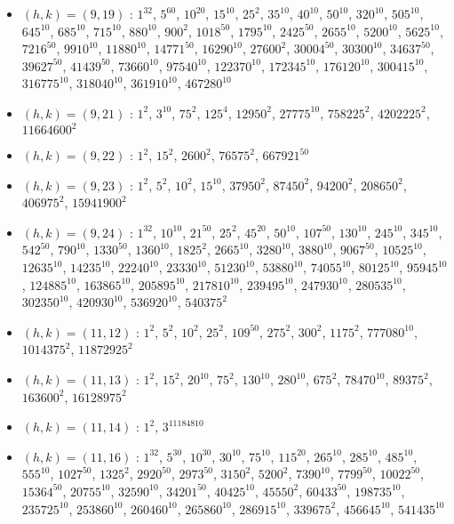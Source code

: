 \begin{itemize}
\item $(h,k)=(9,19)$ : $1^{32}$, $5^{60}$, $10^{20}$, $15^{10}$, $25^{2}$, $35^{10}$, $40^{10}$, $50^{10}$, $320^{10}$, $505^{10}$, $645^{10}$, $685^{10}$, $715^{10}$, $880^{10}$, $900^{2}$, $1018^{50}$, $1795^{10}$, $2425^{50}$, $2655^{10}$, $5200^{10}$, $5625^{10}$, $7216^{50}$, $9910^{10}$, $11880^{10}$, $14771^{50}$, $16290^{10}$, $27600^{2}$, $30004^{50}$, $30300^{10}$, $34637^{50}$, $39627^{50}$, $41439^{50}$, $73660^{10}$, $97540^{10}$, $122370^{10}$, $172345^{10}$, $176120^{10}$, $300415^{10}$, $316775^{10}$, $318040^{10}$, $361910^{10}$, $467280^{10}$
\item $(h,k)=(9,21)$ : $1^{2}$, $3^{10}$, $75^{2}$, $125^{4}$, $12950^{2}$, $27775^{10}$, $758225^{2}$, $4202225^{2}$, $11664600^{2}$
\item $(h,k)=(9,22)$ : $1^{2}$, $15^{2}$, $2600^{2}$, $76575^{2}$, $667921^{50}$
\item $(h,k)=(9,23)$ : $1^{2}$, $5^{2}$, $10^{2}$, $15^{10}$, $37950^{2}$, $87450^{2}$, $94200^{2}$, $208650^{2}$, $406975^{2}$, $15941900^{2}$
\item $(h,k)=(9,24)$ : $1^{32}$, $10^{10}$, $21^{50}$, $25^{2}$, $45^{20}$, $50^{10}$, $107^{50}$, $130^{10}$, $245^{10}$, $345^{10}$, $542^{50}$, $790^{10}$, $1330^{50}$, $1360^{10}$, $1825^{2}$, $2665^{10}$, $3280^{10}$, $3880^{10}$, $9067^{50}$, $10525^{10}$, $12635^{10}$, $14235^{10}$, $22240^{10}$, $23330^{10}$, $51230^{10}$, $53880^{10}$, $74055^{10}$, $80125^{10}$, $95945^{10}$, $124885^{10}$, $163865^{10}$, $205895^{10}$, $217810^{10}$, $239495^{10}$, $247930^{10}$, $280535^{10}$, $302350^{10}$, $420930^{10}$, $536920^{10}$, $540375^{2}$
\item $(h,k)=(11,12)$ : $1^{2}$, $5^{2}$, $10^{2}$, $25^{2}$, $109^{50}$, $275^{2}$, $300^{2}$, $1175^{2}$, $777080^{10}$, $1014375^{2}$, $11872925^{2}$
\item $(h,k)=(11,13)$ : $1^{2}$, $15^{2}$, $20^{10}$, $75^{2}$, $130^{10}$, $280^{10}$, $675^{2}$, $78470^{10}$, $89375^{2}$, $163600^{2}$, $16128975^{2}$
\item $(h,k)=(11,14)$ : $1^{2}$, $3^{11184810}$
\item $(h,k)=(11,16)$ : $1^{32}$, $5^{30}$, $10^{30}$, $30^{10}$, $75^{10}$, $115^{20}$, $265^{10}$, $285^{10}$, $485^{10}$, $555^{10}$, $1027^{50}$, $1325^{2}$, $2920^{50}$, $2973^{50}$, $3150^{2}$, $5200^{2}$, $7390^{10}$, $7799^{50}$, $10022^{50}$, $15364^{50}$, $20755^{10}$, $32590^{10}$, $34201^{50}$, $40425^{10}$, $45550^{2}$, $60433^{50}$, $198735^{10}$, $235725^{10}$, $253860^{10}$, $260460^{10}$, $265860^{10}$, $286915^{10}$, $339675^{2}$, $456645^{10}$, $541435^{10}$

\end{itemize}
